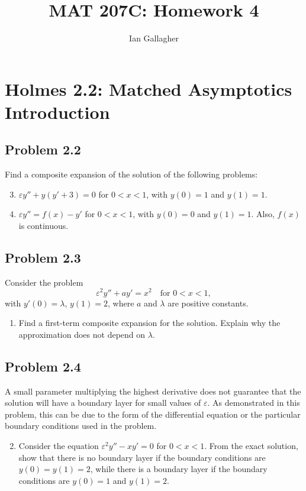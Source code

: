 \documentclass[12pt]{amsart}
\title{MAT 207C: Homework 4}
\author{Ian Gallagher}
\begin{document}
\maketitle

\section*{Holmes 2.2: Matched Asymptotics Introduction}

\subsection*{Problem 2.2}
Find a composite expansion of the solution of the following problems:
\begin{enumerate}[label=(\alph*)]
  \setcounter{enumi}{2}
  \item $\varepsilon y'' + y(y' + 3) = 0$ for $0 < x < 1$, with $y(0) = 1$ and
    $y(1) = 1$.

  \item $\varepsilon y'' = f(x) - y'$ for $0 < x < 1$, with $y(0) = 0$ and $y(1)
    = 1$. Also, $f(x)$ is continuous.
\end{enumerate}

\subsection*{Problem 2.3}
Consider the problem
\[
\varepsilon^2 y'' + a y' = x^2 \quad \text{for } 0 < x < 1,
\]
with $y'(0) = \lambda$, $y(1) = 2$, where $a$ and $\lambda$ are positive constants.
\begin{enumerate}[label=(\alph*)]
  \item Find a first-term composite expansion for the solution. Explain why the
    approximation does not depend on $\lambda$.
\end{enumerate}

\subsection*{Problem 2.4}
A small parameter multiplying the highest derivative does not guarantee that the
solution will have a boundary layer for small values of $\varepsilon$. As
demonstrated in this problem, this can be due to the form of the differential
equation or the particular boundary conditions used in the problem.
\begin{enumerate}[label=(\alph*)]
  \setcounter{enumi}{1}
  \item Consider the equation $\varepsilon^2 y'' - x y' = 0$ for $0 < x < 1$.
    From the exact solution, show that there is no boundary layer if the
    boundary conditions are $y(0) = y(1) = 2$, while there is a boundary layer
    if the boundary conditions are $y(0) = 1$ and $y(1) = 2$.
\end{enumerate}
\end{document}
